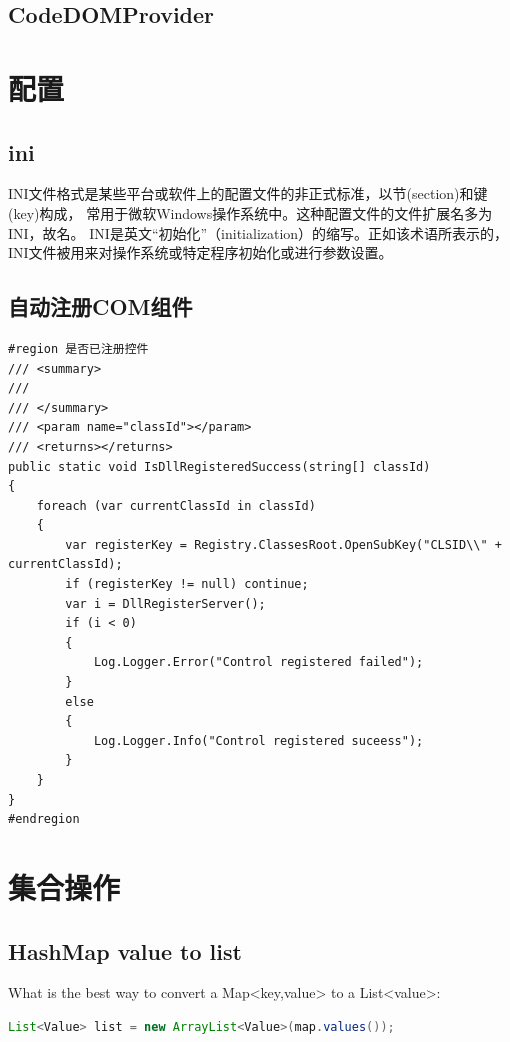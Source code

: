\documentclass{book}
\begin{document}
\subsection{CodeDOMProvider}

\section{配置}

\subsection{ini}

INI文件格式是某些平台或软件上的配置文件的非正式标准，以节(section)和键(key)构成，
常用于微软Windows操作系统中。这种配置文件的文件扩展名多为INI，故名。
INI是英文“初始化”（initialization）的缩写。正如该术语所表示的，
INI文件被用来对操作系统或特定程序初始化或进行参数设置。

\subsection{自动注册COM组件}

\begin{lstlisting}[language={[Sharp]C}]
#region 是否已注册控件
/// <summary>
/// 
/// </summary>
/// <param name="classId"></param>
/// <returns></returns>
public static void IsDllRegisteredSuccess(string[] classId)
{
	foreach (var currentClassId in classId)
	{
		var registerKey = Registry.ClassesRoot.OpenSubKey("CLSID\\" + currentClassId);
		if (registerKey != null) continue;
		var i = DllRegisterServer();
		if (i < 0)
		{
			Log.Logger.Error("Control registered failed");
		}
		else
		{
			Log.Logger.Info("Control registered suceess");
		}
	}
}
#endregion
\end{lstlisting}

\section{集合操作}

\subsection{HashMap value to list}

What is the best way to convert a Map<key,value> to a List<value>:

\begin{lstlisting}[language=Java]
List<Value> list = new ArrayList<Value>(map.values());
\end{lstlisting}
\end{document}
